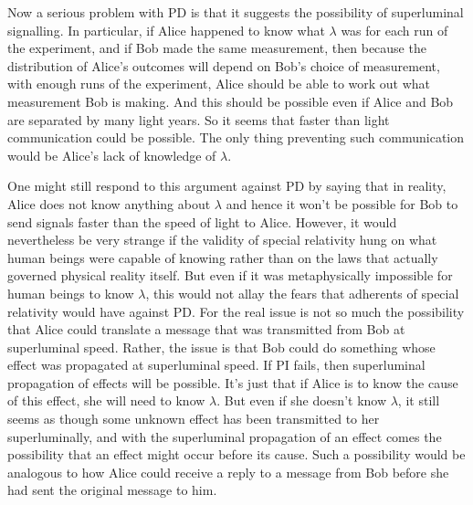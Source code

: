 \documentclass[12pt]{report}
\begin{document}
Now a serious problem with PD is that it suggests the possibility of superluminal signalling. In particular, if Alice happened to know what $\lambda$ was for each run of the experiment, and if Bob made the same measurement, then because the distribution of Alice's outcomes will depend on Bob's choice of measurement, with enough runs of the experiment, Alice should be able to work out what measurement Bob is making. And this should be possible even if Alice and Bob are separated by many light years. So it seems that faster than light communication could be possible. The only thing preventing such communication would be Alice's lack of knowledge of $\lambda$. 

One might still respond to this argument against PD by saying that in reality, Alice does not know anything about $\lambda$ and hence it won't be possible for Bob to send signals faster than the speed of light to Alice. However, it would nevertheless be very strange if the validity of special relativity hung on what human beings were capable of knowing rather than on the laws that actually governed physical reality itself. But even if it was metaphysically impossible for human beings to know $\lambda$, this would not allay the fears that adherents of special relativity would have against PD. For the real issue is not so much the possibility that Alice could translate a message that was transmitted from Bob at superluminal speed. Rather, the issue is that Bob could do something whose effect was propagated at superluminal speed. If PI fails, then superluminal propagation of effects will be possible.\label{lambdaknowledge} It's just that if Alice is to know the cause of this effect, she will need to know $\lambda$. But even if she doesn't know $\lambda$, it still seems as though some unknown effect has been transmitted to her superluminally, and with the superluminal propagation of an effect comes the possibility that an effect might occur before its cause. Such a possibility would be analogous to how Alice could receive a reply to a message from Bob before she had sent the original message to him.

\end{document}

